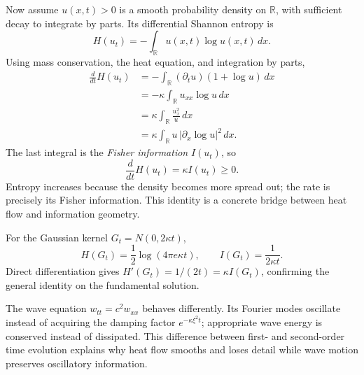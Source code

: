 Now assume \(u(x,t)>0\) is a smooth probability density on \(\mathbb R\), with sufficient decay to integrate by parts. Its differential Shannon entropy is
\[
 H(u_t)=-\int_{\mathbb R}u(x,t)\log u(x,t)\,dx.
\]
Using mass conservation, the heat equation, and integration by parts,
\[
\begin{aligned}
 \frac d{dt}H(u_t)
 &=-\int_{\mathbb R}(\partial_tu)(1+\log u)\,dx\\
 &=-\kappa\int_{\mathbb R}u_{xx}\log u\,dx\\
 &=\kappa\int_{\mathbb R}\frac{u_x^2}{u}\,dx\\
 &=\kappa\int_{\mathbb R}u\,|\partial_x\log u|^2\,dx.
\end{aligned}
\]
The last integral is the \emph{Fisher information} \(I(u_t)\), so
\[
 \boxed{\frac d{dt}H(u_t)=\kappa I(u_t)\ge0.}
\]
Entropy increases because the density becomes more spread out; the rate is precisely its Fisher information. This identity is a concrete bridge between heat flow and information geometry.

For the Gaussian kernel \(G_t=N(0,2\kappa t)\),
\[
 H(G_t)=\frac12\log(4\pi e\kappa t),\qquad
 I(G_t)=\frac1{2\kappa t}.
\]
Direct differentiation gives \(H'(G_t)=1/(2t)=\kappa I(G_t)\), confirming the general identity on the fundamental solution.

The wave equation \(w_{tt}=c^2w_{xx}\) behaves differently. Its Fourier modes oscillate instead of acquiring the damping factor \(e^{-\kappa\xi^2t}\); appropriate wave energy is conserved instead of dissipated. This difference between first- and second-order time evolution explains why heat flow smooths and loses detail while wave motion preserves oscillatory information.
